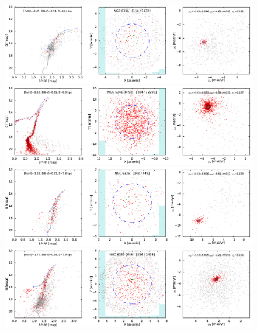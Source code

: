 \documentclass[usenatbib]{mnras}
\begin{document}
\clearpage\begin{figure}
\contcaption{}
\includegraphics{figs/NGC_6316.pdf}
\includegraphics{figs/NGC_6341_M_92.pdf}
\includegraphics{figs/NGC_6325.pdf}
\includegraphics{figs/NGC_6333_M_9.pdf}
\end{figure}
\end{document}
